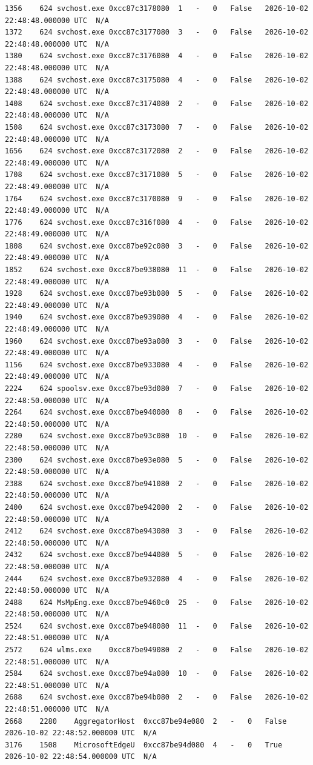 \documentclass[11pt,letterpaper]{article}
\begin{document}
\begin{lstlisting}
1356	624	svchost.exe	0xcc87c3178080	1	-	0	False	2026-10-02 22:48:48.000000 UTC	N/A
1372	624	svchost.exe	0xcc87c3177080	3	-	0	False	2026-10-02 22:48:48.000000 UTC	N/A
1380	624	svchost.exe	0xcc87c3176080	4	-	0	False	2026-10-02 22:48:48.000000 UTC	N/A
1388	624	svchost.exe	0xcc87c3175080	4	-	0	False	2026-10-02 22:48:48.000000 UTC	N/A
1408	624	svchost.exe	0xcc87c3174080	2	-	0	False	2026-10-02 22:48:48.000000 UTC	N/A
1508	624	svchost.exe	0xcc87c3173080	7	-	0	False	2026-10-02 22:48:48.000000 UTC	N/A
1656	624	svchost.exe	0xcc87c3172080	2	-	0	False	2026-10-02 22:48:49.000000 UTC	N/A
1708	624	svchost.exe	0xcc87c3171080	5	-	0	False	2026-10-02 22:48:49.000000 UTC	N/A
1764	624	svchost.exe	0xcc87c3170080	9	-	0	False	2026-10-02 22:48:49.000000 UTC	N/A
1776	624	svchost.exe	0xcc87c316f080	4	-	0	False	2026-10-02 22:48:49.000000 UTC	N/A
1808	624	svchost.exe	0xcc87be92c080	3	-	0	False	2026-10-02 22:48:49.000000 UTC	N/A
1852	624	svchost.exe	0xcc87be938080	11	-	0	False	2026-10-02 22:48:49.000000 UTC	N/A
1928	624	svchost.exe	0xcc87be93b080	5	-	0	False	2026-10-02 22:48:49.000000 UTC	N/A
1940	624	svchost.exe	0xcc87be939080	4	-	0	False	2026-10-02 22:48:49.000000 UTC	N/A
1960	624	svchost.exe	0xcc87be93a080	3	-	0	False	2026-10-02 22:48:49.000000 UTC	N/A
1156	624	svchost.exe	0xcc87be933080	4	-	0	False	2026-10-02 22:48:49.000000 UTC	N/A
2224	624	spoolsv.exe	0xcc87be93d080	7	-	0	False	2026-10-02 22:48:50.000000 UTC	N/A
2264	624	svchost.exe	0xcc87be940080	8	-	0	False	2026-10-02 22:48:50.000000 UTC	N/A
2280	624	svchost.exe	0xcc87be93c080	10	-	0	False	2026-10-02 22:48:50.000000 UTC	N/A
2300	624	svchost.exe	0xcc87be93e080	5	-	0	False	2026-10-02 22:48:50.000000 UTC	N/A
2388	624	svchost.exe	0xcc87be941080	2	-	0	False	2026-10-02 22:48:50.000000 UTC	N/A
2400	624	svchost.exe	0xcc87be942080	2	-	0	False	2026-10-02 22:48:50.000000 UTC	N/A
2412	624	svchost.exe	0xcc87be943080	3	-	0	False	2026-10-02 22:48:50.000000 UTC	N/A
2432	624	svchost.exe	0xcc87be944080	5	-	0	False	2026-10-02 22:48:50.000000 UTC	N/A
2444	624	svchost.exe	0xcc87be932080	4	-	0	False	2026-10-02 22:48:50.000000 UTC	N/A
2488	624	MsMpEng.exe	0xcc87be9460c0	25	-	0	False	2026-10-02 22:48:50.000000 UTC	N/A
2524	624	svchost.exe	0xcc87be948080	11	-	0	False	2026-10-02 22:48:51.000000 UTC	N/A
2572	624	wlms.exe	0xcc87be949080	2	-	0	False	2026-10-02 22:48:51.000000 UTC	N/A
2584	624	svchost.exe	0xcc87be94a080	10	-	0	False	2026-10-02 22:48:51.000000 UTC	N/A
2688	624	svchost.exe	0xcc87be94b080	2	-	0	False	2026-10-02 22:48:51.000000 UTC	N/A
2668	2280	AggregatorHost	0xcc87be94e080	2	-	0	False	2026-10-02 22:48:52.000000 UTC	N/A
3176	1508	MicrosoftEdgeU	0xcc87be94d080	4	-	0	True	2026-10-02 22:48:54.000000 UTC	N/A

\end{lstlisting}
\end{document}
